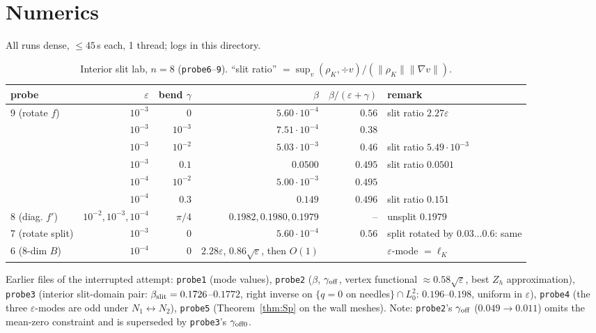 \documentclass[11pt]{article}
\theoremstyle{remark}
\newcommand{\norm}[1]{\|#1\|}
\begin{document}
\section{Numerics}
All runs dense, $\le 45$\,s each, 1 thread; logs in this directory.
\begin{table}[ht]\centering\small
\begin{tabular}{lrrrrl}\toprule
probe & $\varepsilon$ & bend $\gamma$ & $\beta$ & $\beta/(\varepsilon+\gamma)$ & remark\\\midrule
9 (rotate $f$) & $10^{-3}$ & $0$ & $5.60\cdot10^{-4}$ & $0.56$ & slit ratio $2.27\varepsilon$\\
 & $10^{-3}$ & $10^{-3}$ & $7.51\cdot10^{-4}$ & $0.38$ & \\
 & $10^{-3}$ & $10^{-2}$ & $5.03\cdot10^{-3}$ & $0.46$ & slit ratio $5.49\cdot10^{-3}$\\
 & $10^{-3}$ & $0.1$ & $0.0500$ & $0.495$ & slit ratio $0.0501$\\
 & $10^{-4}$ & $10^{-2}$ & $5.00\cdot10^{-3}$ & $0.495$ & \\
 & $10^{-4}$ & $0.3$ & $0.149$ & $0.496$ & slit ratio $0.151$\\
8 (diag. $f'$) & $10^{-2},10^{-3},10^{-4}$ & $\pi/4$ & $0.1982,0.1980,0.1979$ & -- & unsplit $0.1979$\\
7 (rotate split) & $10^{-3}$ & $0$ & $5.60\cdot10^{-4}$ & $0.56$ & split rotated by $0.03\dots0.6$: same\\
6 (8-dim $B$) & $10^{-4}$ & $0$ & $2.28\varepsilon$, $0.86\sqrt\varepsilon$, then $O(1)$ & & $\varepsilon$-mode $=\ell_K$\\
\bottomrule\end{tabular}
\caption{Interior slit lab, $n=8$ (\texttt{probe6}--\texttt{9}). ``slit ratio'' $=\sup_v(\rho_K,\div v)/(\norm{\rho_K}\norm{\nabla v})$.}\label{tab:bend}
\end{table}
Earlier files of the interrupted attempt: \texttt{probe1} (mode values), \texttt{probe2} ($\beta$, $\gamma_{\rm off}$, vertex functional $\approx0.58\sqrt\varepsilon$,
best $Z_h$ approximation), \texttt{probe3} (interior slit-domain pair: $\beta_{\rm slit}=0.1726$--$0.1772$, right inverse on $\{q=0$ on needles$\}\cap L^2_0$: $0.196$--$0.198$,
uniform in $\varepsilon$), \texttt{probe4} (the three $\varepsilon$-modes are odd under $N_1\leftrightarrow N_2$), \texttt{probe5} (Theorem~\ref{thm:Sp} on the wall meshes).
Note: \texttt{probe2}'s $\gamma_{\rm off}$ ($0.049\to0.011$) omits the mean-zero constraint and is superseded by \texttt{probe3}'s $\gamma_{\rm off0}$.
\end{document}
